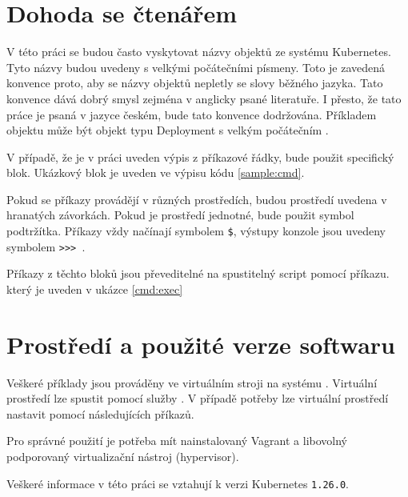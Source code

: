 \section{Dohoda se čtenářem}
V této práci se budou často vyskytovat názvy objektů ze systému Kubernetes. Tyto názvy budou uvedeny s velkými počátečními písmeny. Toto je zavedená konvence proto, aby se názvy objektů nepletly se slovy běžného jazyka. Tato konvence dává dobrý smysl zejména v anglicky psané literatuře. I přesto, že tato práce je psaná v jazyce českém, bude tato konvence dodržována. Příkladem objektu může být objekt typu Deployment s velkým počátečním .

V případě, že je v práci uveden výpis z příkazové řádky, bude použit specifický blok. Ukázkový blok je uveden ve výpisu kódu \ref{sample:cmd}.

Pokud se příkazy provádějí v různých prostředích, budou prostředí uvedena v hranatých závorkách. Pokud je prostředí jednotné, bude použit symbol podtržítka. Příkazy vždy načínají symbolem \verb|$|, výstupy konzole jsou uvedeny symbolem \verb|>>> |.


Příkazy z těchto bloků jsou převeditelné na spustitelný script pomocí příkazu. který je uveden v ukázce \ref{cmd:exec} 


\section{Prostředí a použité verze softwaru}
Veškeré příklady jsou prováděny ve virtuálním stroji na systému . Virtuální prostředí lze spustit pomocí služby . V případě potřeby lze virtuální prostředí nastavit pomocí následujících příkazů.


Pro správné použití je potřeba mít nainstalovaný Vagrant a libovolný podporovaný virtualizační nástroj (hypervisor).

Veškeré informace v této práci se vztahují k verzi Kubernetes \verb|1.26.0|.